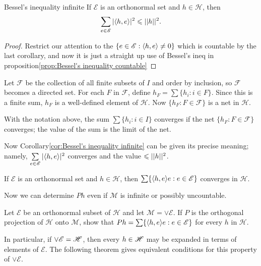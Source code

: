 \begin{corollary}{}{Bessel's inequality infinite}
    If $\mathscr{E}$ is an orthonormal set and $h\in\mathscr{H}$, then
    \begin{align*}
        \sum\limits_{e\in\mathscr{E}}|\langle h,e\rangle|^2\leqslant ||h||^2.
    \end{align*}
\end{corollary}

\begin{proof}
    Restrict our attention to the $\{e \in\mathscr{E} : \langle h,e\rangle\neq 0\}$ which is countable
    by the last corollary, and now it is just a straight up use of Bessel's ineq in proposition\ref{prop:Bessel's inequality countable}
\end{proof}

Let $\mathscr{F}$ be the collection of all finite subsets of $I$ and order 
by inclusion, so $\mathscr{F}$ becomes a directed set. 
For each $F$ in $\mathscr{F}$, define 
$h_F=\sum \{h_i:i\in F\}$. 
Since this is a finite sum, $h_F$ is a well-defined element of $\mathscr{H}$. 
Now $\{h_F: F\in\mathscr{F}\}$ is a net in $\mathscr{H}$.

\begin{definition}{}{}
    With the notation above, the sum $\sum\{h_i:i\in I\}$ converges if 
the net $\{ h_F: F \in\mathscr{F}\}$ converges; the value of the sum is the limit of the net.
\end{definition}

Now Corollary\ref{cor:Bessel's inequality infinite} 
can be given its precise meaning; namely, 
$\sum\limits_{e\in\mathscr{E}}|\langle h,e\rangle|^2$ converges 
and the value $\leqslant ||h||^2$.

\begin{lemma}{}{}
    If $\mathscr{E}$ is an orthonormal set and $h\in\mathscr{H}$,
    then $\sum\{\langle h,e\rangle e:e\in\mathscr{E}\}$ converges in $\mathscr{H}$.
\end{lemma}

Now we can determine $Ph$ even if $\mathscr{M}$ is infinite or possibly uncountable.
\begin{corollary}{}{}
    Let $\mathscr{E}$ be an orthonormal subset of $\mathscr{H}$ and let $\mathscr{M}=\vee \mathscr{E}$. 
    If $P$ is the orthogonal projection of $\mathscr{H}$ onto $\mathscr{M}$,
    show that $Ph=\sum\{\langle h,e\rangle e:e\in\mathscr{E}\}$ for every $h$ in $\mathscr{H}$.
\end{corollary}


In particular, if $\vee \mathscr{E}=\mathscr{H}$, then every $h\in \mathscr{H}$ 
may be expanded in terms of elements of $\mathscr{E}$. 
The following theorem gives equivalent conditions for 
this property of $\vee \mathscr{E}$.

